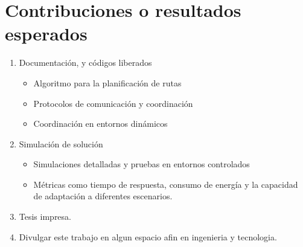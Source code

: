 \documentclass[11pt,epsf,times]{article}
\begin{document}
\newpage
\section*{Contribuciones o resultados esperados}

\begin{enumerate}
\item Documentaci\'{o}n, y c\'{o}digos liberados
  \begin{itemize}
  \item Algoritmo para la planificaci\'{o}n de rutas
  \item Protocolos de comunicaci\'{o}n y coordinaci\'{o}n
  \item Coordinaci\'{o}n en entornos din\'{a}micos
  \end{itemize}
\item Simulaci\'{o}n de soluci\'{o}n
  \begin{itemize}
  \item Simulaciones detalladas y pruebas en entornos controlados
  \item M\'{e}tricas como tiempo de respuesta, consumo de energ\'{i}a y la capacidad de adaptaci\'{o}n a diferentes escenarios. 
  \end{itemize}
\item Tesis impresa.
\item Divulgar este trabajo en algun espacio afin en ingenieria y tecnologia.

\end{enumerate}

\newpage


\end{document}
